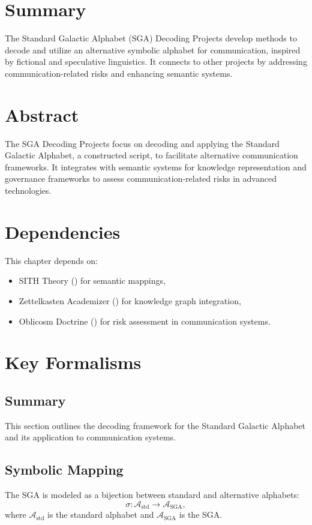 \documentclass[11pt,oneside]{memoir}
\theoremstyle{plain}
\newcommand{\A}{\mathcal{A}}
\begin{document}
\section{Summary}
The Standard Galactic Alphabet (SGA) Decoding Projects develop methods to decode and utilize an alternative symbolic alphabet for communication, inspired by fictional and speculative linguistics. It connects to other projects by addressing communication-related risks and enhancing semantic systems.

\section{Abstract}
The SGA Decoding Projects focus on decoding and applying the Standard Galactic Alphabet, a constructed script, to facilitate alternative communication frameworks. It integrates with semantic systems for knowledge representation and governance frameworks to assess communication-related risks in advanced technologies.

\section{Dependencies}
This chapter depends on:
\begin{itemize}
    \item SITH Theory () for semantic mappings,
    \item Zettelkasten Academizer () for knowledge graph integration,
    \item Oblicosm Doctrine () for risk assessment in communication systems.
\end{itemize}

\section{Key Formalisms}
\subsection{Summary}
This section outlines the decoding framework for the Standard Galactic Alphabet and its application to communication systems.

\subsection{Symbolic Mapping}
The SGA is modeled as a bijection between standard and alternative alphabets:
\begin{equation}
    \sigma: \A_{\text{std}} \to \A_{\text{SGA}},
\end{equation}
where \(\A_{\text{std}}\) is the standard alphabet and \(\A_{\text{SGA}}\) is the SGA.
\end{document}
